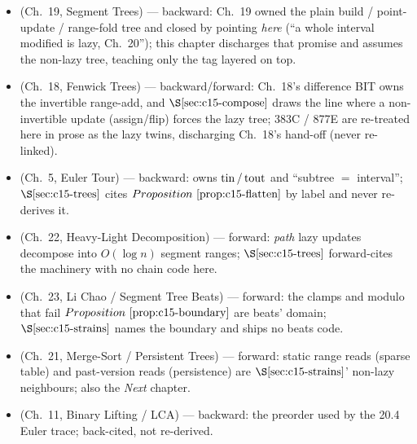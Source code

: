 
\begin{itemize}[nosep, leftmargin=1.4em]
  \item {} (Ch.~19, Segment Trees) --- backward: Ch.~19 owned the plain
        build / point-update / range-fold tree and closed by pointing \emph{here}
        (``a whole interval modified is lazy, Ch.~20''); this chapter discharges that
        promise and assumes the non-lazy tree, teaching only the tag layered on top.
  \item {} (Ch.~18, Fenwick Trees) --- backward/forward: Ch.~18's difference BIT
        owns the invertible range-add, and \(\secref{c15-compose}\) draws the line where a
        non-invertible update (assign/flip) forces the lazy tree; 383C / 877E are re-treated
        here in prose as the lazy twins, discharging Ch.~18's hand-off (never re-linked).
  \item {} (Ch.~5, Euler Tour) --- backward: owns \(\operatorname{tin}/\operatorname{tout}\) and
        ``subtree \(=\) interval''; \(\secref{c15-trees}\) cites \(\propref{c15-flatten}\) by
        label and never re-derives it.
  \item {} (Ch.~22, Heavy-Light Decomposition) --- forward: \emph{path} lazy
        updates decompose into \(O(\log n)\) segment ranges; \(\secref{c15-trees}\) forward-cites
        the machinery with no chain code here.
  \item {} (Ch.~23, Li Chao / Segment Tree Beats) --- forward: the clamps and
        modulo that fail \(\propref{c15-boundary}\) are beats' domain; \(\secref{c15-strains}\)
        names the boundary and ships no beats code.
  \item {} (Ch.~21, Merge-Sort / Persistent Trees) --- forward: static range reads
        (sparse table) and past-version reads (persistence) are \(\secref{c15-strains}\)'
        non-lazy neighbours; also the \emph{Next} chapter.
  \item {} (Ch.~11, Binary Lifting / LCA) --- backward: the preorder used by the
        20.4 Euler trace; back-cited, not re-derived.
\end{itemize}

